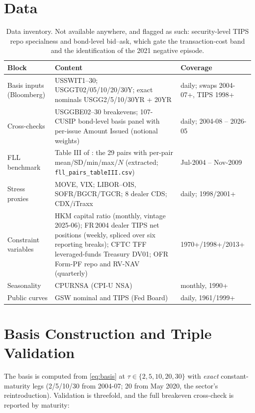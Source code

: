 \documentclass[11pt]{article}
\begin{document}
\section{Data}\label{sec:data}

\begin{table}[h!]
\centering\small
\begin{tabular}{p{4.1cm}p{6.6cm}p{3.6cm}}
\toprule
Block & Content & Coverage \\
\midrule
Basis inputs (Bloomberg) & USSWIT1--30; USGGT02/05/10/20/30Y; exact nominals USGG2/5/10/30YR + 20YR & daily; swaps 2004-07+, TIPS 1998+ \\
Cross-checks & USGGBE02--30 breakevens; 107-CUSIP bond-level basis panel with per-issue Amount Issued (notional weights) & daily; 2004-08 -- 2026-05 \\
FLL benchmark & Table III of \citet{fll2014}: the 29 pairs with per-pair mean/SD/min/max/$N$ (extracted; \texttt{fll\_pairs\_tableIII.csv}) & Jul-2004 -- Nov-2009 \\
Stress proxies & MOVE, VIX; LIBOR--OIS, SOFR/BGCR/TGCR; 8 dealer CDS; CDX/iTraxx & daily; 1998/2001+ \\
Constraint variables & HKM capital ratio (monthly, vintage 2025-06); FR\,2004 dealer TIPS net positions (weekly, spliced over six reporting breaks); CFTC TFF leveraged-funds Treasury DV01; OFR Form-PF repo and RV-NAV (quarterly) & 1970+/1998+/2013+ \\
Seasonality & CPURNSA (CPI-U NSA) & monthly, 1990+ \\
Public curves & GSW nominal and TIPS (Fed Board) & daily, 1961/1999+ \\
\bottomrule
\end{tabular}
\caption{Data inventory. Not available anywhere, and flagged as such: security-level TIPS repo specialness and bond-level bid--ask, which gate the transaction-cost band and the identification of the 2021 negative episode.}
\end{table}

\section{Basis Construction and Triple Validation}\label{sec:valid}

The basis is computed from \eqref{eq:basis} at $\tau\in\{2,5,10,20,30\}$ with \emph{exact} constant-maturity legs (2/5/10/30 from 2004-07; 20 from May 2020, the sector's reintroduction). Validation is threefold, and the full breakeven cross-check is reported by maturity:
\end{document}
